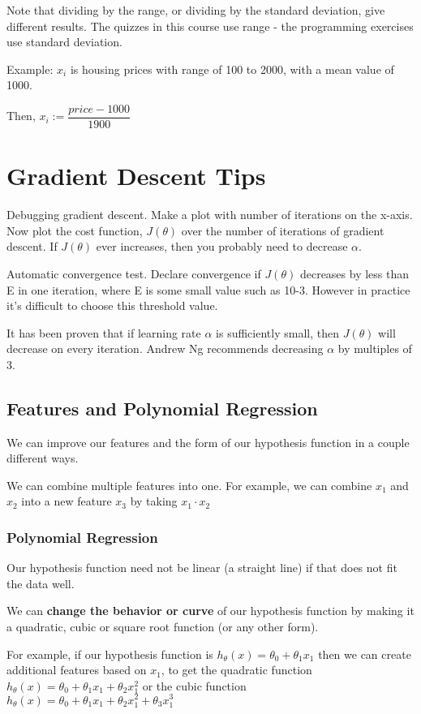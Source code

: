 Note that dividing by the range, or dividing by the standard deviation, give different results. The quizzes in this course use range - the programming exercises use standard deviation.

Example: $x_i$ is housing prices with range of 100 to 2000, with a mean value of 1000. 

Then, $x_i := \dfrac{price-1000}{1900} $
\section{Gradient Descent Tips}
Debugging gradient descent. Make a plot with number of iterations on the x-axis. Now plot the cost function, $J(\theta)$ over the number of iterations of gradient descent. If $J(\theta)$ ever increases, then you probably need to decrease $\alpha$.

Automatic convergence test. Declare convergence if $J(\theta)$ decreases by less than E in one iteration, where E is some small value such as 10-3. However in practice it's difficult to choose this threshold value.

It has been proven that if learning rate $\alpha$ is sufficiently small, then $J(\theta)$ will decrease on every iteration. Andrew Ng recommends decreasing $\alpha$ by multiples of 3.
\subsection{Features and Polynomial Regression}
We can improve our features and the form of our hypothesis function in a couple different ways.

We can combine multiple features into one. For example, we can combine $x_1$ and $x_2$ into a new feature $x_3$ by taking $x_1\cdot x_2$
\subsubsection{Polynomial Regression}
Our hypothesis function need not be linear (a straight line) if that does not fit the data well.

We can {\bf change the behavior or curve} of our hypothesis function by making it a quadratic, cubic or square root function (or any other form).

For example, if our hypothesis function is $h_\theta(x) = \theta_0 + \theta_1 x_1$ then we can create additional features based on $x_1$, to get the quadratic function $h_\theta(x) = \theta_0 + \theta_1 x_1 + \theta_2 x_1^2$ or the cubic function $h_\theta(x) = \theta_0 + \theta_1 x_1 + \theta_2 x_1^2 + \theta_3 x_1^3$ 

